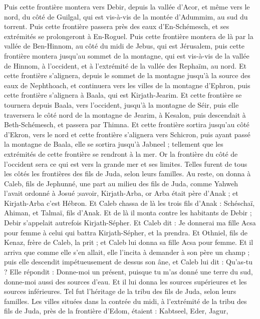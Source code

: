 \begin{multicols}{2}
Puis cette frontière montera vers Debir, depuis la vallée d'Acor, et même vers le nord, du côté de Guilgal, qui est vis-à-vis de la montée d'Adummim, au sud du torrent. Puis cette frontière passera près des eaux d'En-Schémesch, et ses extrémités se prolongeront à En-Roguel.
Puis cette frontière montera de là par la vallée de Ben-Hinnom, au côté du midi de Jebus, qui est Jérusalem, puis cette frontière montera jusqu'au sommet de la montagne, qui est vis-à-vis de la vallée de Hinnom, à l'occident, et à l'extrémité de la vallée des Rephaïm, au nord.
Et cette frontière s'alignera, depuis le sommet de la montagne jusqu'à la source des eaux de Nephthoach, et continuera vers les villes de la montagne d'Ephron, puis cette frontière s'alignera à Baala, qui est Kirjath-Jearim.
Et cette frontière se tournera depuis Baala, vers l'occident, jusqu'à la montagne de Séir, puis elle traversera le côté nord de la montagne de Jearim, à Kesalon, puis descendait à Beth-Schémesch, et passera par Thimna.
Et cette frontière sortira jusqu'au côté d'Ekron, vers le nord et cette frontière s'alignera vers Schicron, puis ayant passé la montagne de Baala, elle se sortira jusqu'à Jabneel ; tellement que les extrémités de cette frontière se rendront à la mer. 
Or la frontière du côté de l'occident sera ce qui est vers la grande mer et ses limites. Telles furent de tous les côtés les frontières des fils de Juda, selon leurs familles.
Au reste, on donna à Caleb, fils de Jephunné, une part au milieu des fils de Juda, comme Yahweh l'avait ordonné à Josué ;savoir, Kirjath-Arba, or Arba était père d'Anak ; et Kirjath-Arba c'est Hébron.
Et Caleb chassa de là les trois fils d'Anak : Schéschaï, Ahiman, et Talmaï, fils d'Anak.
Et de là il monta contre les habitants de Debir ; Debir s'appelait autrefois Kirjath-Sépher.
Et Caleb dit : Je donnerai ma fille Acsa pour femme à celui qui battra Kirjath-Sépher, et la prendra.
Et Othniel, fils de Kenaz, frère de Caleb, la prit ; et Caleb lui donna sa fille Acsa pour femme.
Et il arriva que comme elle s'en allait, elle l'incita à demander à son père un champ ; puis elle descendit impétueusement de dessus son âne, et Caleb lui dit : Qu'as-tu ? 
Elle répondit : Donne-moi un présent, puisque tu m'as donné une terre du sud, donne-moi aussi des sources d'eau. Et il lui donna les sources supérieures et les sources inférieures.
Tel fut l'héritage de la tribu des fils de Juda, selon leurs familles.
Les villes situées dans la contrée du midi, à l'extrémité de la tribu des fils de Juda, près de la frontière d'Edom, étaient : Kabtseel, Eder, Jagur,

\end{multicols}
